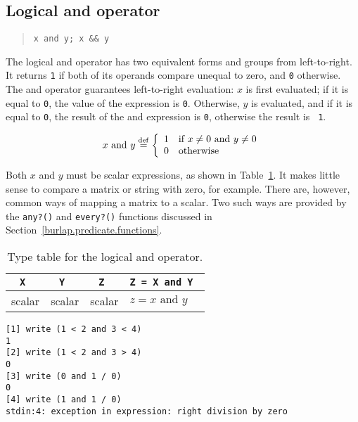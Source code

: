 \subsection{Logical {\sc and} operator}
\label{burlap.op.and}

\begin{quote}
\begin{verbatim}
x and y; x && y
\end{verbatim}
\end{quote}

The logical {\sc and} operator has two equivalent forms and groups
from left-to-right.  It returns {\tt 1} if both of its operands
compare unequal to zero, and {\tt 0} otherwise.  The {\sc and}
operator guarantees left-to-right evaluation: $x$ is first evaluated;
if it is equal to {\tt 0}, the value of the expression is {\tt 0}.
Otherwise, $y$ is evaluated, and if it is equal to {\tt 0}, the result
of the {\sc and} expression is {\tt 0}, otherwise the result is {\tt
1}.

\begin{displaymath}
x \mbox{ and } y \stackrel{\rm def}{=} \left\{
\begin{array}{ll}
1 & \mbox{if $x \neq 0$ and $y \neq 0$} \\
0 & \mbox{otherwise}
\end{array} \right.
\end{displaymath}

Both $x$ and $y$ must be scalar expressions, as shown in
Table~\ref{burlap.and.types}.  It makes little sense to compare a
matrix or string with zero, for example.  There are, however, common
ways of mapping a matrix to a scalar.  Two such ways are provided by
the {\tt any?()} and {\tt every?()} functions discussed in
Section~\ref{burlap.predicate.functions}.

\begin{table}[htbp]
\begin{center}
\begin{tabular}{c|c|c|l}
\tt X  & \tt Y	& \tt Z	 & \tt Z = X and Y \\
\hline
scalar & scalar & scalar & $z = x \mbox{ and } y$ \\
\end{tabular}
\caption{Type table for the logical {\sc and} operator.}
\label{burlap.and.types}
\end{center}
\end{table}

\begin{screen}
\begin{verbatim}
[1] write (1 < 2 and 3 < 4)
1
[2] write (1 < 2 and 3 > 4)
0
[3] write (0 and 1 / 0)
0
[4] write (1 and 1 / 0)
stdin:4: exception in expression: right division by zero
\end{verbatim}
\end{screen}


